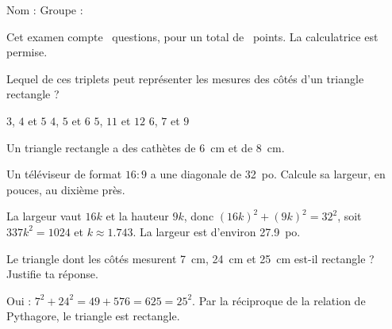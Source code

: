 \documentclass[11pt, addpoints]{exam}   %
\begin{document}
\noindent Nom : \makebox[8cm]{\hrulefill} \hfill Groupe : \makebox[2cm]{\hrulefill}

\vspace{4mm}
\noindent Cet examen compte \numquestions\ questions, pour un total de
\numpoints\ points. La calculatrice est permise.

\begin{center}
  \gradetable[h][questions]
\end{center}

\begin{questions}

\question[2] Lequel de ces triplets peut représenter les mesures des
côtés d'un triangle rectangle ?
\begin{choices}
  \CorrectChoice $3$, $4$ et $5$
  \choice $4$, $5$ et $6$
  \choice $5$, $11$ et $12$
  \choice $6$, $7$ et $9$
\end{choices}

\question Un triangle rectangle a des cathètes de \qty{6}{\centi\metre}
et de \qty{8}{\centi\metre}.

\question[4] Un téléviseur de format $16:9$ a une diagonale de
\qty{32}{po}. Calcule sa largeur, en pouces, au dixième près.
\begin{solution}[3cm]
  La largeur vaut $16k$ et la hauteur $9k$, donc
  $(16k)^2 + (9k)^2 = 32^2$, soit $337k^2 = 1024$ et
  $k \approx \num{1,743}$. La largeur est d'environ \qty{27,9}{po}.
\end{solution}

\question[3] Le triangle dont les côtés mesurent \qty{7}{\centi\metre},
\qty{24}{\centi\metre} et \qty{25}{\centi\metre} est-il rectangle ?
Justifie ta réponse.
\begin{solution}[3cm]
  Oui : $7^2 + 24^2 = 49 + 576 = 625 = 25^2$. Par la réciproque de la
  relation de Pythagore, le triangle est rectangle.
\end{solution}

\end{questions}
\end{document}
